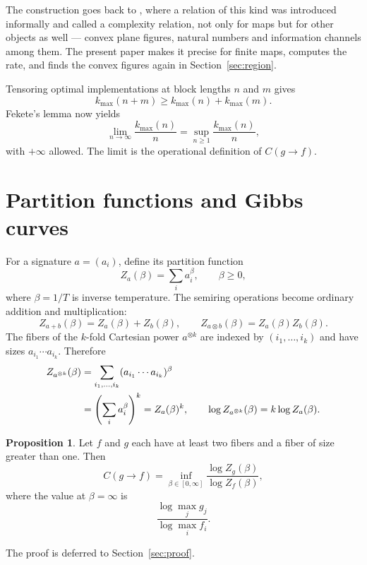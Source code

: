 \documentclass[11pt]{article}
\theoremstyle{definition}
\newtheorem{proposition}{Proposition}
\theoremstyle{remark}
\begin{document}
The construction goes back to \cite{vorozhtsov-2001}, where a relation of this
kind was introduced informally and called a complexity relation, not only for
maps but for other objects as well --- convex plane figures, natural numbers
and information channels among them.  The present paper makes it precise for
finite maps, computes the rate, and finds the convex figures again in
Section~\ref{sec:region}.

Tensoring optimal implementations at block lengths \(n\) and \(m\) gives
\[
  k_{\max}(n+m)\geq k_{\max}(n)+k_{\max}(m).
\]
Fekete's lemma now yields
\[
  \lim_{n\to\infty}\frac{k_{\max}(n)}{n}
  =\sup_{n\geq1}\frac{k_{\max}(n)}{n},
\]
with \(+\infty\) allowed.  The limit is the operational definition of
\(C(g\to f)\).

\section{Partition functions and Gibbs curves}
\label{sec:partition-functions}

For a signature \(a=(a_i)\), define its partition function
\[
  Z_a(\beta)=\sum_i a_i^\beta,\qquad \beta\geq0,
\]
where \(\beta=1/T\) is inverse temperature.  The semiring operations become ordinary addition and
multiplication:
\[
  Z_{a+b}(\beta)=Z_a(\beta)+Z_b(\beta),
  \qquad
  Z_{a\otimes b}(\beta)=Z_a(\beta)Z_b(\beta).
\]
The fibers of the \(k\)-fold Cartesian power \(a^{\otimes k}\) are indexed by
\((i_1,\ldots,i_k)\) and have sizes \(a_{i_1}\cdots a_{i_k}\).  Therefore
\begin{align}
  Z_{a^{\otimes k}}(\beta)
  &=\sum_{i_1,\ldots,i_k}
    (a_{i_1}\cdots a_{i_k})^\beta \notag\\
  &=\left(\sum_i a_i^\beta\right)^k
   =Z_a(\beta)^k,
  \qquad
  \log Z_{a^{\otimes k}}(\beta)=k\log Z_a(\beta).
  \label{eq:tensor-partition}
\end{align}

\begin{proposition}
\label{prop:rate}
Let \(f\) and \(g\) each have at least two fibers and a fiber of size greater
than one.  Then
\begin{equation}
  \label{eq:rate}
  C(g\to f)
  =\inf_{\beta\in[0,\infty]}
    \frac{\log Z_g(\beta)}{\log Z_f(\beta)},
\end{equation}
where the value at \(\beta=\infty\) is
\[
  \frac{\log\max_j g_j}{\log\max_i f_i}.
\]
\end{proposition}

The proof is deferred to Section~\ref{sec:proof}.
\end{document}
